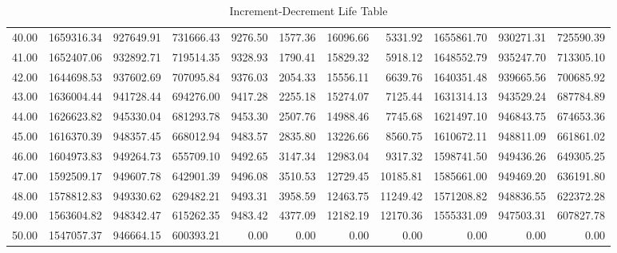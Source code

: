 \begin{table}[ht]
\begin{tabular}{rrrrrrrrrrr}
  40.00 & 1659316.34 & 927649.91 & 731666.43 & 9276.50 & 1577.36 & 16096.66 & 5331.92 & 1655861.70 & 930271.31 & 725590.39 \\ 
  41.00 & 1652407.06 & 932892.71 & 719514.35 & 9328.93 & 1790.41 & 15829.32 & 5918.12 & 1648552.79 & 935247.70 & 713305.10 \\ 
  42.00 & 1644698.53 & 937602.69 & 707095.84 & 9376.03 & 2054.33 & 15556.11 & 6639.76 & 1640351.48 & 939665.56 & 700685.92 \\ 
  43.00 & 1636004.44 & 941728.44 & 694276.00 & 9417.28 & 2255.18 & 15274.07 & 7125.44 & 1631314.13 & 943529.24 & 687784.89 \\ 
  44.00 & 1626623.82 & 945330.04 & 681293.78 & 9453.30 & 2507.76 & 14988.46 & 7745.68 & 1621497.10 & 946843.75 & 674653.36 \\ 
  45.00 & 1616370.39 & 948357.45 & 668012.94 & 9483.57 & 2835.80 & 13226.66 & 8560.75 & 1610672.11 & 948811.09 & 661861.02 \\ 
  46.00 & 1604973.83 & 949264.73 & 655709.10 & 9492.65 & 3147.34 & 12983.04 & 9317.32 & 1598741.50 & 949436.26 & 649305.25 \\ 
  47.00 & 1592509.17 & 949607.78 & 642901.39 & 9496.08 & 3510.53 & 12729.45 & 10185.81 & 1585661.00 & 949469.20 & 636191.80 \\ 
  48.00 & 1578812.83 & 949330.62 & 629482.21 & 9493.31 & 3958.59 & 12463.75 & 11249.42 & 1571208.82 & 948836.55 & 622372.28 \\ 
  49.00 & 1563604.82 & 948342.47 & 615262.35 & 9483.42 & 4377.09 & 12182.19 & 12170.36 & 1555331.09 & 947503.31 & 607827.78 \\ 
  50.00 & 1547057.37 & 946664.15 & 600393.21 & 0.00 & 0.00 & 0.00 & 0.00 & 0.00 & 0.00 & 0.00 \\ 
   \hline
\end{tabular}
\caption{Increment-Decrement Life Table} 
\end{table}
